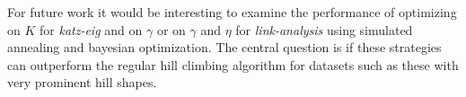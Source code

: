 For future work it would be interesting to examine the performance of optimizing on $K$ for \textit{katz-eig} and on $\gamma$ or on $\gamma$ and $\eta$ for \textit{link-analysis} using simulated annealing and bayesian optimization. The central question is if these strategies can outperform the regular hill climbing algorithm for datasets such as these with very prominent hill shapes.



